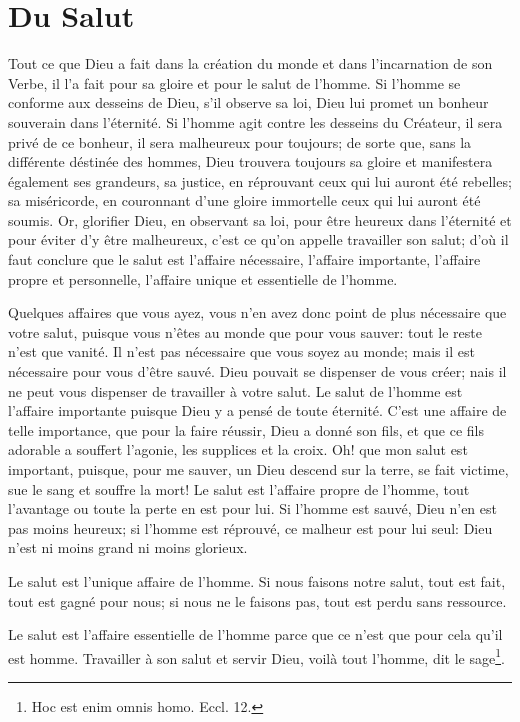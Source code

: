 \documentclass[instructions.tex]{subfiles}
\begin{document}
 
\chapter{Du Salut}

\primo Tout ce que Dieu a fait dans la création du monde et dans l'incarnation de son Verbe, il l'a fait pour sa gloire et pour le salut de l'homme. Si l'homme se conforme aux desseins de Dieu, s'il observe sa loi, Dieu lui promet un bonheur souverain dans l'éternité. Si l'homme agit contre les desseins du Créateur, il sera privé de ce bonheur, il sera malheureux pour toujours; de sorte que, sans la différente déstinée des hommes, Dieu trouvera toujours sa gloire et manifestera également ses grandeurs, sa justice, en réprouvant ceux qui lui auront été rebelles; sa miséricorde, en couronnant d'une gloire immortelle ceux qui lui auront été soumis. Or, glorifier Dieu, en observant sa loi, pour être heureux dans l'éternité et pour éviter d'y être malheureux, c'est ce qu'on appelle travailler son salut; d'où il faut conclure que le salut est l'affaire nécessaire, l'affaire importante, l'affaire propre et personnelle, l'affaire unique et essentielle de l'homme.

\secundo Quelques affaires que vous ayez, vous n'en avez donc point de plus nécessaire que votre salut, puisque vous n'êtes au monde que pour vous sauver: tout le reste n'est que vanité. Il n'est pas nécessaire que vous soyez au monde; mais il est nécessaire pour vous d'être sauvé. Dieu pouvait se dispenser de vous créer; nais il ne peut vous dispenser de travailler à votre salut. 
Le salut de l'homme est l'affaire importante puisque Dieu y a pensé de toute éternité. C'est une affaire de telle importance, que pour la faire réussir, Dieu a donné son fils, et que ce fils adorable a souffert l'agonie, les supplices et la croix. Oh! que mon salut est important, puisque, pour me sauver, un Dieu descend sur la terre, se fait victime, sue le sang et souffre la mort! 
Le salut est l'affaire propre de l'homme, tout l'avantage ou toute la perte en est pour lui. Si l'homme est sauvé, Dieu n'en est pas moins heureux; si l'homme est réprouvé, ce malheur est pour lui seul: Dieu n'est ni moins grand ni moins glorieux.

Le salut est l'unique affaire de l'homme. Si nous faisons notre salut, tout est fait, tout est gagné pour nous; si nous ne le faisons pas, tout est perdu sans ressource. 

Le salut est l'affaire essentielle de l'homme parce que ce n'est que pour cela qu'il est homme. Travailler à son salut et servir Dieu, voilà tout l'homme, dit le sage\footnote{Hoc est enim omnis homo. Eccl. 12.}.
\end{document}
